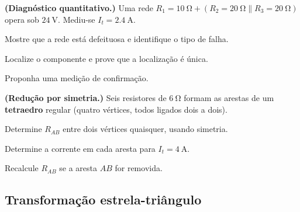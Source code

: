 \begin{questao}[4]{}

\textbf{(Diagnóstico quantitativo.)} Uma rede
$R_1=\SI{10}{\ohm}+(R_2=\SI{20}{\ohm}\parallel R_3=\SI{20}{\ohm})$ opera sob
$\SI{24}{\volt}$. Mediu-se $I_t=\SI{2.4}{\ampere}$.
\begin{itensq}
\item Mostre que a rede está defeituosa e identifique o tipo de falha.
\item Localize o componente e prove que a localização é única.
\item Proponha uma medição de confirmação.
\end{itensq}


\end{questao}
\begin{questao}[4]{}

\textbf{(Redução por simetria.)} Seis resistores de $\SI{6}{\ohm}$ formam as
arestas de um \textbf{tetraedro} regular (quatro vértices, todos ligados dois a
dois).
\begin{itensq}
\item Determine $R_{AB}$ entre dois vértices quaisquer, usando simetria.
\item Determine a corrente em cada aresta para $I_t=\SI{4}{\ampere}$.
\item Recalcule $R_{AB}$ se a aresta $AB$ for removida.
\end{itensq}


\end{questao}


\subsection{Transformação estrela-triângulo}

